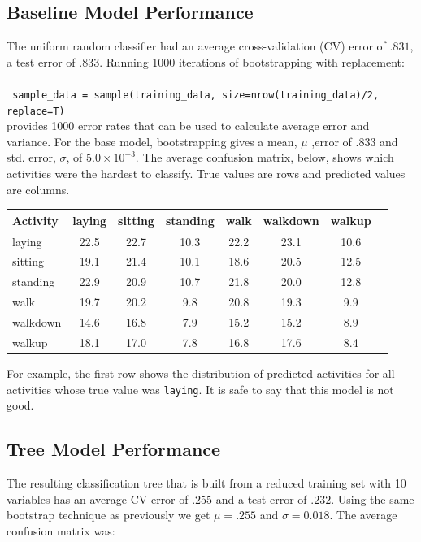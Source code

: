 \documentclass[paper=a4, fontsize=11pt]{scrartcl} %
\numberwithin{equation}{section} %
\numberwithin{figure}{section} %
\numberwithin{table}{section} %
\begin{document}
\subsection{Baseline Model Performance}
The uniform random classifier had an average cross-validation (CV) error of $.831$, 
a test error of $.833$. Running 1000 iterations of bootstrapping with replacement:\\\\
\texttt{ sample\_data = sample(training\_data, size=nrow(training\_data)/2, replace=T) }
\\provides 1000 error rates that can be used to calculate average error and variance. 
For the base model, bootstrapping gives a mean, $\mu$ ,error of $.833$ and std. error,
$\sigma$, of $5.0\times10^{-3}$. The average confusion matrix, below, shows which activities were the hardest to classify. True values are rows and predicted values are columns.

\begin{center}
\begin{tabular}{l*{6}{c}r}
Activity              & laying & sitting & standing & walk & walkdown  & walkup \\
\hline
laying & 22.5  & 22.7  & 10.3  & 22.2  & 23.1  & 10.6 \\
sitting & 19.1  & 21.4  & 10.1  & 18.6  & 20.5  & 12.5 \\
standing & 22.9  & 20.9  & 10.7  & 21.8  & 20.0  & 12.8 \\
walk    & 19.7  & 20.2  & 9.8  & 20.8  & 19.3  & 9.9 \\
walkdown & 14.6  & 16.8  & 7.9  & 15.2  & 15.2 & 8.9 \\
walkup & 18.1  & 17.0 & 7.8  & 16.8  & 17.6 & 8.4 \\
\end{tabular}
\end{center}

For example, the first row shows the distribution of predicted activities for all
activities whose true value was \texttt{laying}. It is safe to say that this model is not good.


\subsection{Tree Model Performance}
The resulting classification tree that is built from a reduced training set with
10 variables has an average CV error of $.255$ and a test error of $.232$. Using the same
 bootstrap technique as previously we get $\mu = .255$ and $\sigma = 0.018$. The 
 average confusion matrix was:
\end{document}

